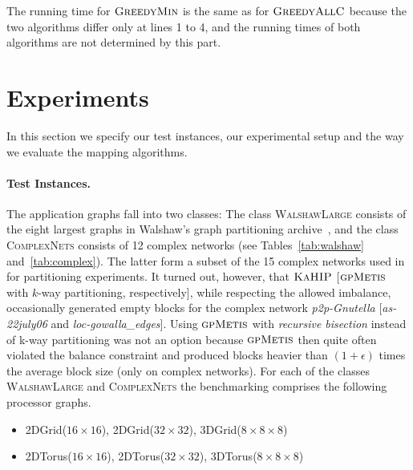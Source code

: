 \documentclass[pdftex]{llncs}
\newcommand{\gpmetis}{\textsc{gpMetis}\xspace}
\newcommand{\kahip}{\textsc{KaHIP}\xspace}
\newcommand{\greedyallc}{\textsc{GreedyAllC}\xspace}
\newcommand{\greedymin}{\textsc{GreedyMin}\xspace}
\newcommand{\walshawlarge}{\textsc{WalshawLarge}\xspace}
\newcommand{\complexnets}{\textsc{ComplexNets}\xspace}
\begin{document}
The running time for $\greedymin$ is the same as for $\greedyallc$
because the two algorithms differ only at lines 1 to 4, and the
running times of both algorithms are not determined by this part.


\section{Experiments}
\label{sec:exp}
In this section we specify our test instances, our experimental setup
and the way we evaluate the mapping algorithms.

\paragraph{Test Instances.}
\label{sub:exp-instances}
The application graphs fall into two classes: The class \walshawlarge consists of the eight largest graphs in
Walshaw's graph partitioning archive~\cite{SoperWC04combined}, and the
class \complexnets consists of 12 complex networks (see
Tables~\ref{tab:walshaw} and~\ref{tab:complex}). The latter form a
subset of the 15 complex networks used in~\cite{Safro2012a}
for partitioning experiments. It turned out, however, that $\kahip$
[$\gpmetis$ with $k$-way partitioning, respectively], while respecting
the allowed imbalance, occasionally generated empty blocks for the
complex network \emph{p2p-Gnutella} [\emph{as-22july06} and
  \emph{loc-gowalla\_edges}]. Using $\gpmetis$ with \emph{recursive
  bisection} instead of k-way partitioning was not an option because
$\gpmetis$ then quite often violated the balance constraint and
produced blocks heavier than $(1+\epsilon)$ times the average block
size (only on complex networks).
For each of the classes \walshawlarge and
\complexnets the benchmarking comprises the following processor graphs.
\begin{itemize}
    \item {\small 2DGrid($16 \times 16$), 2DGrid($32 \times 32$), 3DGrid($8 \times 8 \times 8$)}
    \item {\small 2DTorus($16 \times 16$), 2DTorus($32 \times 32$), 3DTorus($8 \times 8 \times 8$)}
\end{itemize}
\end{document}
